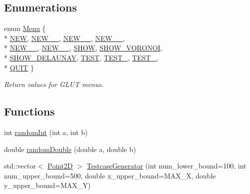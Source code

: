 \subsection*{Enumerations}
\begin{DoxyCompactItemize}
\item 
enum \hyperlink{namespacecmst_a8dff7ccfde8a2770160b5f8dbf81c3b9}{Menu} \{ \\*
\hyperlink{namespacecmst_a8dff7ccfde8a2770160b5f8dbf81c3b9acc1b341b1550c4009942f0a14b433fb5}{N\+EW}, 
\hyperlink{namespacecmst_a8dff7ccfde8a2770160b5f8dbf81c3b9a5c1bbae108fea09abee0ae385bc729bf}{N\+E\+W\+\_\+\_}, 
\hyperlink{namespacecmst_a8dff7ccfde8a2770160b5f8dbf81c3b9a613b1d9e468c6e26e23c33a2abb2833e}{N\+E\+W\+\_\+\_}, 
\hyperlink{namespacecmst_a8dff7ccfde8a2770160b5f8dbf81c3b9a7ca958e9941ebe27acf2ae7511b735ba}{N\+E\+W\+\_\+\_}, 
\\*
\hyperlink{namespacecmst_a8dff7ccfde8a2770160b5f8dbf81c3b9a35fe2b5c1c0015c3aee5049bee8b8acd}{N\+E\+W\+\_\+\_}, 
\hyperlink{namespacecmst_a8dff7ccfde8a2770160b5f8dbf81c3b9a73f732474a8fd1746e18e85ac18965f0}{N\+E\+W\+\_\+\_}, 
\hyperlink{namespacecmst_a8dff7ccfde8a2770160b5f8dbf81c3b9a4484f6b658f88772d77bfeaaa19b7a11}{S\+H\+OW}, 
\hyperlink{namespacecmst_a8dff7ccfde8a2770160b5f8dbf81c3b9acb33c06abf6f54d270a6a6f26b3b0ec4}{S\+H\+O\+W\+\_\+\+V\+O\+R\+O\+N\+OI}, 
\\*
\hyperlink{namespacecmst_a8dff7ccfde8a2770160b5f8dbf81c3b9a4a94d06c45900d709f4714d9fdebb3f0}{S\+H\+O\+W\+\_\+\+D\+E\+L\+A\+U\+N\+AY}, 
\hyperlink{namespacecmst_a8dff7ccfde8a2770160b5f8dbf81c3b9a95c752e50b27aaae9aa758293828007f}{T\+E\+ST}, 
\hyperlink{namespacecmst_a8dff7ccfde8a2770160b5f8dbf81c3b9a9996ad31ad035f42371059ad53098246}{T\+E\+S\+T\+\_}, 
\hyperlink{namespacecmst_a8dff7ccfde8a2770160b5f8dbf81c3b9a3f5dd18e08446227f6ce81fed096c339}{T\+E\+S\+T\+\_}, 
\\*
\hyperlink{namespacecmst_a8dff7ccfde8a2770160b5f8dbf81c3b9af46a16cac81f794824d0d87fb5588e33}{Q\+U\+IT}
 \}\begin{DoxyCompactList}\small\item\em Return values for G\+L\+UT menus. \end{DoxyCompactList}
\end{DoxyCompactItemize}
\subsection*{Functions}
\begin{DoxyCompactItemize}
\item 
int \hyperlink{namespacecmst_a844037f018f3d5b7b1f1a5f4463da501}{random\+Int} (int a, int b)
\item 
double \hyperlink{namespacecmst_a8df08a5847caeb65a6606968e40f336f}{random\+Double} (double a, double b)
\item 
std\+::vector$<$ \hyperlink{classcmst_1_1_point2_d}{Point2D} $>$ \hyperlink{namespacecmst_abd1822f67dc5d2be959508e628be0633}{Testcase\+Generator} (int num\+\_\+lower\+\_\+bound=100, int num\+\_\+upper\+\_\+bound=500, double x\+\_\+upper\+\_\+bound=M\+A\+X\+\_\+X, double y\+\_\+upper\+\_\+bound=M\+A\+X\+\_\+Y)
\end{DoxyCompactItemize}



